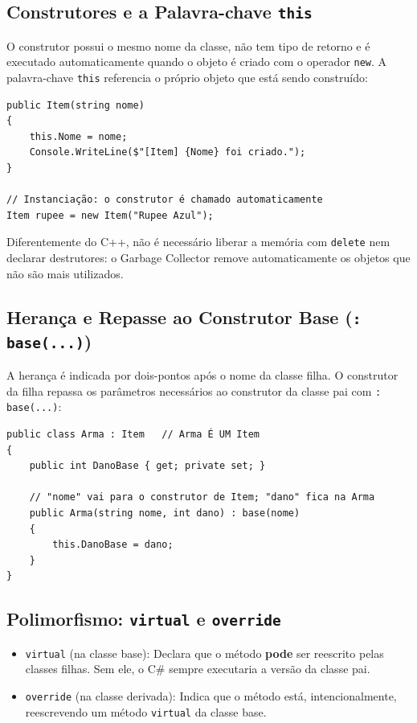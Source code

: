 \subsection{Construtores e a Palavra-chave \texttt{this}}

O construtor possui o mesmo nome da classe, não tem tipo de retorno e é executado
automaticamente quando o objeto é criado com o operador \texttt{new}. A palavra-chave
\texttt{this} referencia o próprio objeto que está sendo construído:

\begin{lstlisting}[style=csharp]
public Item(string nome)
{
    this.Nome = nome;
    Console.WriteLine($"[Item] {Nome} foi criado.");
}

// Instanciação: o construtor é chamado automaticamente
Item rupee = new Item("Rupee Azul");
\end{lstlisting}

Diferentemente do C++, não é necessário liberar a memória com \texttt{delete} nem declarar
destrutores: o Garbage Collector remove automaticamente os objetos que não são mais utilizados.

\subsection{Herança e Repasse ao Construtor Base (\texttt{: base(...)})}

A herança é indicada por dois-pontos após o nome da classe filha. O construtor da filha repassa
os parâmetros necessários ao construtor da classe pai com \texttt{: base(...)}:

\begin{lstlisting}[style=csharp]
public class Arma : Item   // Arma É UM Item
{
    public int DanoBase { get; private set; }

    // "nome" vai para o construtor de Item; "dano" fica na Arma
    public Arma(string nome, int dano) : base(nome)
    {
        this.DanoBase = dano;
    }
}
\end{lstlisting}

\subsection{Polimorfismo: \texttt{virtual} e \texttt{override}}

\begin{itemize}
    \item \texttt{virtual} (na classe base): Declara que o método \textbf{pode} ser reescrito
    pelas classes filhas. Sem ele, o C\# sempre executaria a versão da classe pai.

    \item \texttt{override} (na classe derivada): Indica que o método está, intencionalmente,
    reescrevendo um método \texttt{virtual} da classe base.
\end{itemize}

